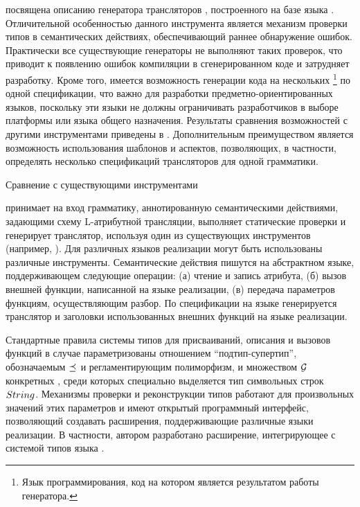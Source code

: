  посвящена описанию генератора трансляторов \ATF{}, построенного на базе языка \GRM{}. Отличительной особенностью данного инструмента является механизм проверки типов в семантических действиях, обеспечивающий раннее обнаружение ошибок. Практически все существующие генераторы не выполняют таких проверок, что приводит к появлению ошибок компиляции в сгенерированном коде и затрудняет разработку. Кроме того, имеется возможность генерации кода на нескольких \footnote{Язык программирования, код на котором является результатом работы генератора.} по одной спецификации, что важно для разработки предметно-ориентированных языков, поскольку эти языки не должны ограничивать разработчиков в выборе платформы или языка общего назначения. Результаты сравнения возможностей \ATF{} с другими инструментами приведены в . Дополнительным преимуществом \ATF{} является возможность использования шаблонов и аспектов, позволяющих, в частности, определять несколько спецификаций трансляторов для одной грамматики.

\begin{table}[htbp]
	\centering
\newcommand{\dissonly}[1]{}
	
	\caption{Сравнение \ATF{} с существующими инструментами}\label{AtfTable}
\end{table}

\ATF{} принимает на вход грамматику, аннотированную семантическими действиями, задающими схему L-атрибутной трансляции, выполняет статические проверки и генерирует транслятор, используя один из существующих инструментов (например, ). Для различных языков реализации могут быть использованы различные инструменты. Семантические действия пишутся на абстрактном языке, поддерживающем следующие операции: (а) чтение и запись атрибута, (б) вызов внешней функции, написанной на языке реализации, (в) передача параметров функциям, осуществляющим разбор. По спецификации на языке \ATF{} генерируется транслятор и заголовки использованных внешних функций на языке реализации.

Стандартные правила системы типов для присваиваний, описания и вызовов функций в случае \ATF{} параметризованы отношением ``подтип-супертип'', обозначаемым $\preceq_{}$ и регламентирующим полиморфизм, и множеством ${\mathcal{G}_{}}$ конкретных , среди которых специально выделяется тип символьных строк $String_{}$. Механизмы проверки и реконструкции типов работают для произвольных значений этих параметров и имеют открытый программный интерфейс, позволяющий создавать расширения, поддерживающие различные языки реализации. В частности, автором разработано расширение, интегрирующее \ATF{} с системой типов языка . 

